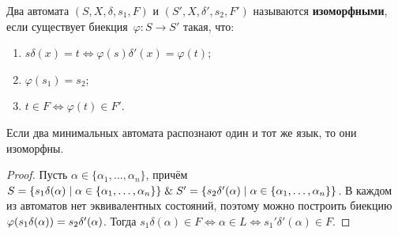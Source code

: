 Два автомата $(S, X, \delta, s_1, F)$ и $(S', X, \delta', s_2, F')$ называются \textbf{изоморфными}, если существует биекция~$\varphi \colon S \to S'$ такая, что:
\begin{enumerate}
	\item $s \delta(x) = t \Leftrightarrow \varphi(s) \delta'(x) = \varphi(t)$;
	\item $\varphi(s_1) = s_2$;
	\item $t \in F \Leftrightarrow \varphi(t) \in F'$.
\end{enumerate}

\begin{statement}
Если два минимальных автомата распознают один и тот же язык, то они изоморфны.
\end{statement}
\begin{proof}
Пусть $\alpha \in \{ \alpha_1, \ldots, \alpha_n \}$, причём $S = \{ s_1 \delta(\alpha) \mid \alpha \in \{ \alpha_1, \ldots, \alpha_n \} \} \opbr\lAnd S' \opbr= \{ s_2 \delta'(\alpha) \mid \alpha \opbr\in \{ \alpha_1, \ldots, \alpha_n \} \}$.
В каждом из автоматов нет эквивалентных состояний, поэтому можно построить биекцию $\varphi(s_1 \delta(\alpha)) \opbr= s_2 \delta'(\alpha)$.
Тогда $s_1 \delta(\alpha) \in F \Leftrightarrow \alpha \in L \Leftrightarrow s_1' \delta'(\alpha) \in F$.
\end{proof}

